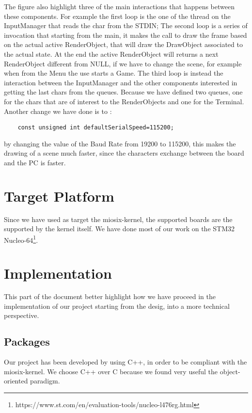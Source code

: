 \documentclass{article}
\begin{document}
The figure also highlight three of the main interactions that happens between these components.
For example the first loop is the one of the thread on the InputManager that reads the char from the STDIN;
The second loop is a series of invocation that starting from the main, it makes the call to draw the frame based on the actual active RenderObject, that will draw the DrawObject associated to the actual state.
At the end the active RenderObject will returns a next RenderObject different from NULL, if we have to change the scene, for example when from the Menu the use starts a Game.
The third loop is instead the interaction between the InputManager and the other components interested in getting the last chars from the queues. Because we have defined two queues, one for the chars that are of interest to the RenderObjects and one for the Terminal.
Another change we have done is to :
\begin{verbatim}
    const unsigned int defaultSerialSpeed=115200;
\end{verbatim}
by changing the value of the Baud Rate from 19200 to 115200, this makes the drawing of a scene much faster, since the characters exchange between the board and the PC is faster.

\section{Target Platform}
Since we have used as target the miosix-kernel, the supported boards are the supported by the kernel itself. We have done most of our work on the STM32 Nucleo-64\footnote{https://www.st.com/en/evaluation-tools/nucleo-l476rg.html}.

\section{Implementation}
This part of the document better highlight how we have proceed in the implementation of our project starting from the desig, into a more technical perspective.

\subsection{Packages}
Our project has been developed by using C++\cite{slidec++}, in order to be compliant with the miosix-kernel\cite{miosix}.
We choose C++ over C because we found very useful the object-oriented paradigm. 
\end{document}
